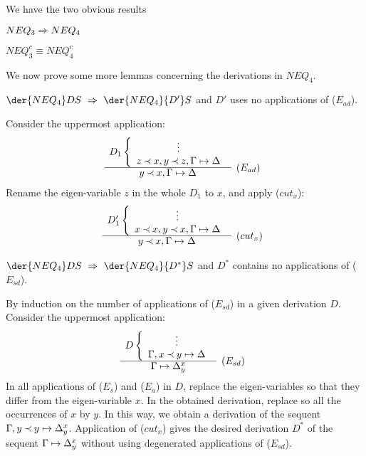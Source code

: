 We have the two obvious results
\begin{LEMMA}\label{le:neq3toneq4}
 $NEQ_3 \mathrel\Rightarrow NEQ_4$
\end{LEMMA}
\begin{LEMMA}\label{le:neq3cisneq4c}
 $NEQ_3^c \equiv NEQ_4^c$
\end{LEMMA}

We now prove some more lemmas concerning the derivations in $NEQ_4$.
\begin{LEMMA}\label{le:noEad}
 $\der{NEQ_4}DS\ \impl\ \der{NEQ_4}{D'}S$ and $D'$ uses no applications of ($E_{ad}$).
\end{LEMMA}
\begin{PROOF}
Consider the uppermost application:
\[ \begin{array}{cl}
D_1 \left \{ \begin{array}{c}
 \vdots \\
 z\Incl x, y\Incl z, \Gamma\Seq\Delta \end{array} \right . \\ \cline{1-1}
 y \Incl x, \Gamma\Seq\Delta & \raisebox{1.2ex}[1.5ex][0ex]{$(E_{ad})$}
\end{array} \]
Rename the eigen-variable $z$ in the whole $D_1$ to $x$, and apply ($cut_x$):
\[ \begin{array}{cl}
D_1' \left \{ \begin{array}{c}
 \vdots \\
 x\Incl x, y\Incl x, \Gamma\Seq\Delta \end{array} \right . \\ \cline{1-1}
 y \Incl x, \Gamma\Seq\Delta & \raisebox{1.2ex}[1.5ex][0ex]{$(cut_x)$}
\end{array} \]
\end{PROOF}

\begin{LEMMA}\label{le:noEsd} $\der{NEQ_4}DS\ \impl\ \der{NEQ_4}{D^*}S$
and $D^*$ contains no applications of ($E_{sd}$).
\end{LEMMA}
\begin{PROOF}
By induction on the number of applications of ($E_{sd}$) in a given
derivation $D$. Consider the uppermost application:
\[ \begin{array}{cl}
D\left\{ \begin{array}{c}
 \vdots \\
 \Gamma,x\Incl y\Seq\Delta \end{array} \right. \\ \cline{1-1}
 \Gamma\Seq\Delta_y^x  &  \raisebox{1.2ex}[1.5ex][0ex]{($E_{sd}$)}
\end{array} \]
In all applications of ($E_s$) and ($E_a$) in $D$, replace the
eigen-variables so that they differ from the eigen-variable $x$. In the obtained
derivation, replace so all the occurrences of $x$ by $y$. In this way, we 
obtain a derivation of the sequent $\Gamma,y\mathbin{\prec} y\mathrel{\mapsto}\Delta_y^x$. 
Application of ($cut_x$) gives the desired derivation $D^*$ of the
sequent $\Gamma\mathrel{\mapsto}\Delta_y^x$ 
without using degenerated applications of ($E_{sd}$).
\end{PROOF}
%
%

